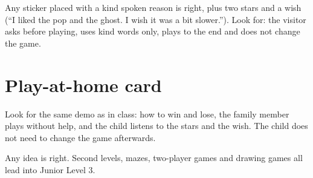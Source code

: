 \begin{answer}
Any sticker placed with a kind spoken reason is right, plus two stars and a wish (\enquote{I liked the pop and the ghost. I wish it was a bit slower.}). Look for: the visitor asks before playing, uses kind words only, plays to the end and does not change the game.
\end{answer}

\section{Play-at-home card}
\begin{answer}
Look for the same demo as in class: how to win and lose, the family member plays without help, and the child listens to the stars and the wish. The child does not need to change the game afterwards.
\end{answer}

\begin{answer}
Any idea is right. Second levels, mazes, two-player games and drawing games all lead into Junior Level 3.
\end{answer}

